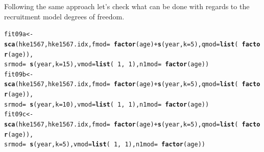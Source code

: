 \documentclass[a4paper,english,11pt]{article}\usepackage[]{graphicx}\usepackage[]{xcolor}
\makeatletter
\newcommand{\hlnum}[1]{\textcolor[rgb]{0.686,0.059,0.569}{#1}}%
\newcommand{\hlopt}[1]{\textcolor[rgb]{0,0,0}{#1}}%
\newcommand{\hldef}[1]{\textcolor[rgb]{0.345,0.345,0.345}{#1}}%
\newcommand{\hlkwb}[1]{\textcolor[rgb]{0.69,0.353,0.396}{#1}}%
\newcommand{\hlkwc}[1]{\textcolor[rgb]{0.333,0.667,0.333}{#1}}%
\newcommand{\hlkwd}[1]{\textcolor[rgb]{0.737,0.353,0.396}{\textbf{#1}}}%
\newenvironment{kframe}{%
 \def\at@end@of@kframe{}%
 \ifinner\ifhmode%
  \def\at@end@of@kframe{\end{minipage}}%
  \begin{minipage}{\columnwidth}%
 \fi\fi%
 \def\FrameCommand##1{\hskip\@totalleftmargin \hskip-\fboxsep
 \colorbox{shadecolor}{##1}\hskip-\fboxsep
     \hskip-\linewidth \hskip-\@totalleftmargin \hskip\columnwidth}%
 \MakeFramed {\advance\hsize-\width
   \@totalleftmargin\z@ \linewidth\hsize
   \@setminipage}}%
 {\par\unskip\endMakeFramed%
 \at@end@of@kframe}
\newenvironment{knitrout}{}{} %
\makeatother
\begin{document}
Following the same approach let's check what can be done with regards to the recruitment model degrees of freedom.

\begin{knitrout}
\color{fgcolor}\begin{kframe}
\begin{alltt}
\hldef{fit09a} \hlkwb{<-} \hlkwd{sca}\hldef{(hke1567, hke1567.idx,} \hlkwc{fmod} \hldef{=} \hlopt{~}\hlkwd{factor}\hldef{(age)} \hlopt{+} \hlkwd{s}\hldef{(year,} \hlkwc{k} \hldef{=} \hlnum{5}\hldef{),} \hlkwc{qmod} \hldef{=} \hlkwd{list}\hldef{(}\hlopt{~}\hlkwd{factor}\hldef{(age)),}
    \hlkwc{srmod} \hldef{=} \hlopt{~}\hlkwd{s}\hldef{(year,} \hlkwc{k} \hldef{=} \hlnum{15}\hldef{),} \hlkwc{vmod} \hldef{=} \hlkwd{list}\hldef{(}\hlopt{~}\hlnum{1}\hldef{,} \hlopt{~}\hlnum{1}\hldef{),} \hlkwc{n1mod} \hldef{=} \hlopt{~}\hlkwd{factor}\hldef{(age))}
\hldef{fit09b} \hlkwb{<-} \hlkwd{sca}\hldef{(hke1567, hke1567.idx,} \hlkwc{fmod} \hldef{=} \hlopt{~}\hlkwd{factor}\hldef{(age)} \hlopt{+} \hlkwd{s}\hldef{(year,} \hlkwc{k} \hldef{=} \hlnum{5}\hldef{),} \hlkwc{qmod} \hldef{=} \hlkwd{list}\hldef{(}\hlopt{~}\hlkwd{factor}\hldef{(age)),}
    \hlkwc{srmod} \hldef{=} \hlopt{~}\hlkwd{s}\hldef{(year,} \hlkwc{k} \hldef{=} \hlnum{10}\hldef{),} \hlkwc{vmod} \hldef{=} \hlkwd{list}\hldef{(}\hlopt{~}\hlnum{1}\hldef{,} \hlopt{~}\hlnum{1}\hldef{),} \hlkwc{n1mod} \hldef{=} \hlopt{~}\hlkwd{factor}\hldef{(age))}
\hldef{fit09c} \hlkwb{<-} \hlkwd{sca}\hldef{(hke1567, hke1567.idx,} \hlkwc{fmod} \hldef{=} \hlopt{~}\hlkwd{factor}\hldef{(age)} \hlopt{+} \hlkwd{s}\hldef{(year,} \hlkwc{k} \hldef{=} \hlnum{5}\hldef{),} \hlkwc{qmod} \hldef{=} \hlkwd{list}\hldef{(}\hlopt{~}\hlkwd{factor}\hldef{(age)),}
    \hlkwc{srmod} \hldef{=} \hlopt{~}\hlkwd{s}\hldef{(year,} \hlkwc{k} \hldef{=} \hlnum{5}\hldef{),} \hlkwc{vmod} \hldef{=} \hlkwd{list}\hldef{(}\hlopt{~}\hlnum{1}\hldef{,} \hlopt{~}\hlnum{1}\hldef{),} \hlkwc{n1mod} \hldef{=} \hlopt{~}\hlkwd{factor}\hldef{(age))}


\end{alltt}
\end{kframe}
\end{knitrout}
\end{document}
